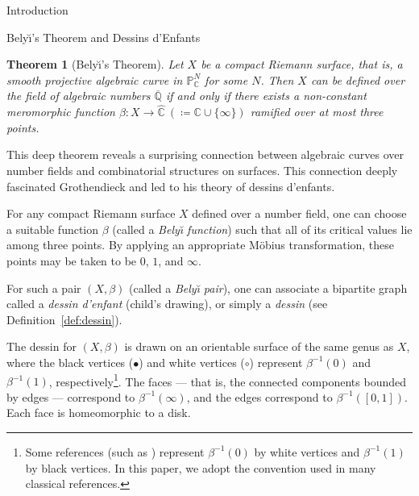 \documentclass[12pt,reqno]{amsart}
\makeatletter
\newif\if@noindentafterheading
\renewcommand\section{\@startsection{section}{1}{\z@}%
  {-3.5ex \@plus -1ex \@minus -.2ex}%
  {2.6ex \@plus .2ex}%
  {\normalfont\large\bfseries}%
}
\renewcommand\subsection{\@startsection{subsection}{2}{\z@}%
  {-2.5ex \@plus -.3ex \@minus -.2ex}%
  {1.5ex \@plus .2ex}%
  {\normalfont\bfseries}%
}
\let\orig@section\section
\renewcommand\section{%
  \@ifstar{\section@star}{\section@nostar}%
}
\newcommand\section@nostar{%
  \@ifnextchar[{\section@opt}{\section@noopt}%
}
\newcommand\section@opt[2][]{%
  \global\@noindentafterheadingtrue
  \orig@section[#1]{#2}%
  \global\@noindentafterheadingfalse
}
\newcommand\section@noopt[1]{%
  \global\@noindentafterheadingtrue
  \orig@section{#1}%
  \global\@noindentafterheadingfalse
}
\newcommand\section@star[1]{%
  \global\@noindentafterheadingtrue
  \orig@section*{#1}%
  \global\@noindentafterheadingfalse
}
\let\orig@subsection\subsection
\renewcommand\subsection{%
  \@ifstar{\subsection@star}{\subsection@nostar}%
}
\newcommand\subsection@nostar{%
  \@ifnextchar[{\subsection@opt}{\subsection@noopt}%
}
\newcommand\subsection@opt[2][]{%
  \global\@noindentafterheadingtrue
  \orig@subsection[#1]{#2}%
  \global\@noindentafterheadingfalse
}
\newcommand\subsection@noopt[1]{%
  \global\@noindentafterheadingtrue
  \orig@subsection{#1}%
  \global\@noindentafterheadingfalse
}
\newcommand\subsection@star[1]{%
  \global\@noindentafterheadingtrue
  \orig@subsection*{#1}%
  \global\@noindentafterheadingfalse
}
\newcommand{\Qb}{\overline{\mathbb{Q}}}					%
\newcommand{\C}{\mathbb{C}}								%
\newcommand{\Ch}{\widehat{\mathbb{C}}}					%
\newcommand{\Pj}{\mathbb{P}}								%
\newcommand{\B}{\beta}									%
\newcommand{\OL}{\vspace{5mm}}							%
\newcommand{\ceq}{\coloneqq} 							%
\theoremstyle{mythmstyle}
\newtheorem{thm}[lemma]{Theorem}
\theoremstyle{mydefstyle}
\newcommand{\defref}[1]{Definition~\ref{#1}}
\newcommand{\belyi}{Bely\u{\i}\xspace}
\newcommand{\dde}{dessin d'enfant\xspace}
\newcommand{\ddes}{dessins d'enfants\xspace}
\newcommand{\DdEs}{Dessins d'Enfants\xspace}
\numberwithin{equation}{section}
\makeatother
\begin{document}

\section{Introduction}

\subsection{\belyi's Theorem and \DdEs}

\label{sec:belyi}
\begin{thm}[\belyi's Theorem]\cite{Belyi79}\cite{Belyi02}\cite[Theorem~1.3]{Jones16}
Let $X$ be a compact Riemann surface, that is, a smooth projective algebraic curve in
$\Pj_{\C}^{N}$ for some $N$.
Then $X$ can be defined over the field of algebraic numbers $\Qb$ if and only if there exists a non-constant meromorphic
function $\B\colon X \to \Ch\ (\ceq \C \cup \{ \infty \})$ ramified over at most three points.
\end{thm}

This deep theorem reveals a surprising connection between algebraic curves over
number fields and combinatorial structures on surfaces. This connection deeply
fascinated Grothendieck and led to his theory of \ddes.

For any compact Riemann surface $X$ defined over a number field, one can choose a suitable
function $\B$ (called a \emph{\belyi function}) such that all of its critical values lie among
three points.
By applying an appropriate M\"obius transformation, these points may be taken to be
$0$, $1$, and $\infty$.

For such a pair $(X, \B)$ (called a \emph{\belyi pair}), one can associate a bipartite graph
called a \emph{\dde} (child's drawing), or simply a \emph{dessin}
(see \defref{def:dessin}).

The dessin for $(X, \B)$ is drawn on an orientable surface of the same genus as $X$, where the black vertices ($\bullet$)
 and white vertices ($\circ$) represent $\B^{-1}(0)$ and $\B^{-1}(1)$, respectively\footnote{Some references
(such as \cite{Jones16}) represent $\B^{-1}(0)$ by white vertices and $\B^{-1}(1)$ by black vertices.
In this paper, we adopt the convention used in many classical references.}.
The faces --- that is, the connected components bounded by edges --- correspond to $\B^{-1}(\infty)$, and
the edges correspond to $\B^{-1}([0,1])$. Each face is homeomorphic to a disk.
\end{document}

